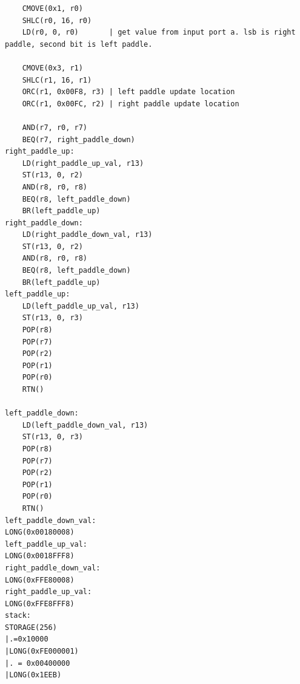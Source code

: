 \documentclass{article}
\begin{document}
\begin{lstlisting}
	CMOVE(0x1, r0)
	SHLC(r0, 16, r0)
	LD(r0, 0, r0)		| get value from input port a. lsb is right paddle, second bit is left paddle.
	
	CMOVE(0x3, r1)
	SHLC(r1, 16, r1)
	ORC(r1, 0x00F8, r3)	| left paddle update location
	ORC(r1, 0x00FC, r2) | right paddle update location
	
	AND(r7, r0, r7)
	BEQ(r7, right_paddle_down)
right_paddle_up:
	LD(right_paddle_up_val, r13)
	ST(r13, 0, r2)
	AND(r8, r0, r8)
	BEQ(r8, left_paddle_down)
	BR(left_paddle_up)
right_paddle_down:
	LD(right_paddle_down_val, r13)
	ST(r13, 0, r2)
	AND(r8, r0, r8)
	BEQ(r8, left_paddle_down)
	BR(left_paddle_up)
left_paddle_up:
	LD(left_paddle_up_val, r13)
	ST(r13, 0, r3)
	POP(r8)
	POP(r7)
	POP(r2)
	POP(r1)
	POP(r0)
	RTN()
	
left_paddle_down:
	LD(left_paddle_down_val, r13)
	ST(r13, 0, r3)
	POP(r8)
	POP(r7)
	POP(r2)
	POP(r1)
	POP(r0)
	RTN()
left_paddle_down_val:
LONG(0x00180008)
left_paddle_up_val:
LONG(0x0018FFF8)
right_paddle_down_val:
LONG(0xFFE80008)
right_paddle_up_val:
LONG(0xFFE8FFF8)
stack:
STORAGE(256)
|.=0x10000
|LONG(0xFE000001)
|. = 0x00400000
|LONG(0x1EEB)
\end{lstlisting}
\end{document}
